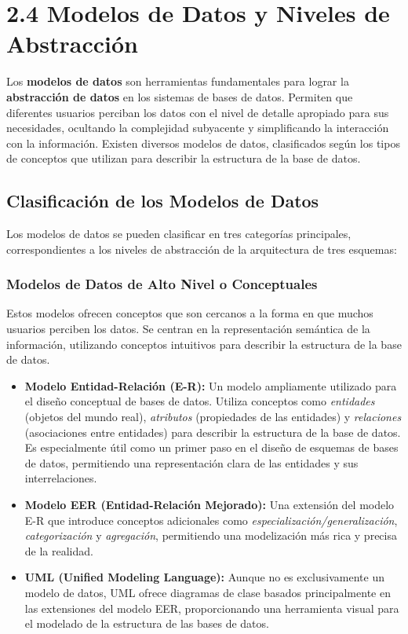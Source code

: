 \section{2.4 Modelos de Datos y Niveles de Abstracción}

Los \textbf{modelos de datos} son herramientas fundamentales para lograr la \textbf{abstracción de datos} en los sistemas de bases de datos.  Permiten que diferentes usuarios perciban los datos con el nivel de detalle apropiado para sus necesidades, ocultando la complejidad subyacente y simplificando la interacción con la información.  Existen diversos modelos de datos, clasificados según los tipos de conceptos que utilizan para describir la estructura de la base de datos.

\subsection{Clasificación de los Modelos de Datos}

Los modelos de datos se pueden clasificar en tres categorías principales, correspondientes a los niveles de abstracción de la arquitectura de tres esquemas:

\subsubsection{Modelos de Datos de Alto Nivel o Conceptuales}

Estos modelos ofrecen conceptos que son cercanos a la forma en que muchos usuarios perciben los datos.  Se centran en la representación semántica de la información, utilizando conceptos intuitivos para describir la estructura de la base de datos.

\begin{itemize}
    \item \textbf{Modelo Entidad-Relación (E-R):} Un modelo ampliamente utilizado para el diseño conceptual de bases de datos.  Utiliza conceptos como \textit{entidades} (objetos del mundo real), \textit{atributos} (propiedades de las entidades) y \textit{relaciones} (asociaciones entre entidades) para describir la estructura de la base de datos.  Es especialmente útil como un primer paso en el diseño de esquemas de bases de datos, permitiendo una representación clara de las entidades y sus interrelaciones.
    \item \textbf{Modelo EER (Entidad-Relación Mejorado):} Una extensión del modelo E-R que introduce conceptos adicionales como \textit{especialización/generalización}, \textit{categorización} y \textit{agregación}, permitiendo una modelización más rica y precisa de la realidad.
    \item \textbf{UML (Unified Modeling Language):} Aunque no es exclusivamente un modelo de datos, UML ofrece diagramas de clase basados principalmente en las extensiones del modelo EER, proporcionando una herramienta visual para el modelado de la estructura de las bases de datos.
\end{itemize}

